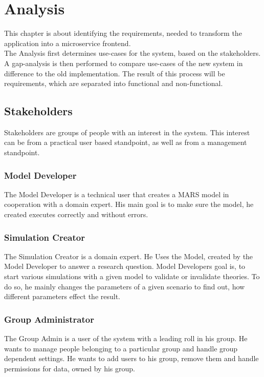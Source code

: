 
\chapter{Analysis}
This chapter is about identifying the requirements, needed to transform the application into a microservice frontend.\\
The Analysis first determines use-cases for the system, based on the stakeholders. A gap-analysis is then performed to compare use-cases of the new system in difference to the old implementation. The result of this process will be requirements, which are separated into functional and non-functional.


\section{Stakeholders}
Stakeholders are groups of people with an interest in the system. This interest can be from a practical user based standpoint, as well as from a management standpoint.

\subsection{Model Developer}
The Model Developer is a technical user that creates a MARS model in cooperation with a domain expert. His main goal is to make sure the model, he created executes correctly and without errors.

\subsection{Simulation Creator}
The Simulation Creator is a domain expert. He Uses the Model, created by the Model Developer to answer a research question. Model Developers goal is, to start various simulations with a given model to validate or invalidate theories. To do so, he mainly changes the parameters of a given scenario to find out, how different parameters effect the result.

\subsection{Group Administrator}
The Group Admin is a user of the system with a leading roll in his group. He wants to manage people belonging to a particular group and handle group dependent settings. He wants to add users to his group, remove them and handle permissions for data, owned by his group.

